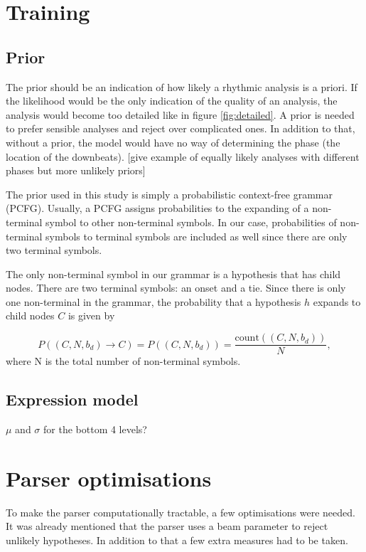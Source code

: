 \section{Training}

\subsection{Prior}

The prior should be an indication of how likely a rhythmic analysis is a priori. If the likelihood would be the only indication of the quality of an analysis, the analysis would become too detailed like in figure \ref{fig:detailed}. A prior is needed to prefer sensible analyses and reject over complicated ones. In addition to that, without a prior, the model would have no way of determining the phase (the location of the downbeats). [give example of equally likely analyses with different phases but more unlikely priors]

The prior used in this study is simply a probabilistic context-free grammar (PCFG). Usually, a PCFG assigns probabilities to the expanding of a non-terminal symbol to other non-terminal symbols. In our case, probabilities of non-terminal symbols to terminal symbols are included as well since there are only two terminal symbols.

The only non-terminal symbol in our grammar is a hypothesis that has child nodes. There are two terminal symbols: an onset and a tie. Since there is only one non-terminal in the grammar, the probability that a hypothesis $h$ expands to child nodes $C$ is given by

\begin{equation}
P((C, N, b_d) \rightarrow C) = P((C, N, b_d)) = \frac{\mathrm{count}((C, N, b_d))}{N},
\end{equation}
where N is the total number of non-terminal symbols.

\subsection{Expression model}

$\mu$ and $\sigma$ for the bottom 4 levels?


\section{Parser optimisations}

To make the parser computationally tractable, a few optimisations were needed. It was already mentioned that the parser uses a beam parameter to reject unlikely hypotheses. In addition to that a few extra measures had to be taken.

